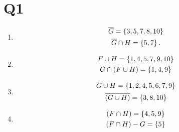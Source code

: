 \section{Q1}
\begin{enumerate}[label = (\alph*)]
    \item \begin{gather*}
        \overline{G} = \left\{3, 5, 7, 8, 10 \right\} \\
        \overline{G} \cap H = \left\{5, 7\right\}. 
    \end{gather*}

    \item \begin{gather*}
        F \cup H = \left\{1, 4, 5, 7 , 9, 10\right\} \\
        G \cap \left(F \cup H\right) = \left\{1, 4, 9\right\}
    \end{gather*}

    \item \begin{gather*}
        G \cup H = \left\{1, 2, 4, 5, 6, 7, 9\right\} \\
        \overline{\left(G \cup H\right)} = \left\{3, 8, 10\right\}
    \end{gather*}

    \item \begin{gather*}
        \left(F \cap H\right) = \left\{4, 5, 9\right\} \\
        \left(F  \cap H \right) - G = \left\{5\right\}
    \end{gather*}
\end{enumerate}